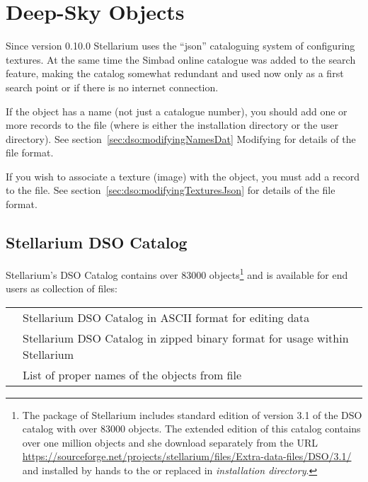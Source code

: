 
\chapter{Deep-Sky Objects}
\label{ch:DSO}


Since version 0.10.0 Stellarium uses the ``json'' cataloguing system
of configuring textures. At the same time the Simbad online catalogue
was added to the search feature, making the catalog somewhat redundant
and used now only as a first search point or if there is no internet
connection.

If the object has a name (not just a catalogue number), you should add
one or more records to the  file
(where  is either the installation directory or the user
directory). See section~\ref{sec:dso:modifyingNamesDat} Modifying 
for details of the file format.

If you wish to associate a texture (image) with the object, you must 
add a record to the  file. See
section~\ref{sec:dso:modifyingTexturesJson} for details of the file format.


\section{Stellarium DSO Catalog}
\label{sec:dso:catalog}

Stellarium's DSO Catalog contains over 83000 objects\footnote{The package of Stellarium includes standard edition of version 3.1 of the DSO catalog with over 83000 objects. The extended edition of this catalog contains over one million objects and she download separately from the URL \url{https://sourceforge.net/projects/stellarium/files/Extra-data-files/DSO/3.1/} and installed by hands to the  or replaced in \emph{installation directory}.} and is available for end users as collection of files:

\begin{longtabu} to \textwidth {lX}
 &Stellarium DSO Catalog in ASCII format for editing data\\
 &Stellarium DSO Catalog in zipped binary format for usage within Stellarium\\
   &List of proper names of the objects from file 
\end{longtabu}

